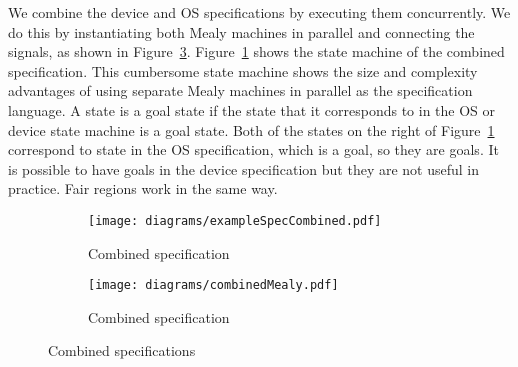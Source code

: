 We combine the device and OS specifications by executing them concurrently. We do this by instantiating both Mealy machines in parallel and connecting the signals, as shown in Figure~\ref{fig:combined_spec_mealy}. Figure~\ref{fig:combined_spec} shows the state machine of the combined specification. This cumbersome state machine shows the size and complexity advantages of using separate Mealy machines in parallel as the specification language. A state is a goal state if the state that it corresponds to in the OS or device state machine is a goal state. Both of the states on the right of Figure~\ref{fig:combined_spec} correspond to state  in the OS specification, which is a goal, so they are goals. It is possible to have goals in the device specification but they are not useful in practice. Fair regions work in the same way.

\begin{figure}
\centering
\begin{subfigure}[t]{0.47\textwidth}
\texttt{[image: diagrams/exampleSpecCombined.pdf]}
\caption{Combined specification}
\label{fig:combined_spec}
\end{subfigure}
\hfill
\begin{subfigure}[t]{0.47\textwidth}
\texttt{[image: diagrams/combinedMealy.pdf]}
\caption{Combined specification}
\label{fig:combined_spec_mealy}
\end{subfigure}
\caption{Combined specifications}
\end{figure}

